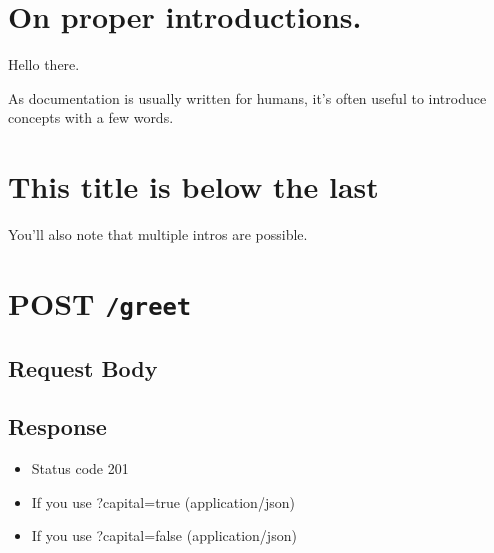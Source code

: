 \section{On proper introductions.}

Hello there.

As documentation is usually written for humans, it's often useful to introduce concepts with a few words.

\section{This title is below the last}

You'll also note that multiple intros are possible.

\section{\texorpdfstring{POST \texttt{/greet}}{POST /greet}}

\subsection{Request Body}

\begin{Shaded}
\begin{Highlighting}[]
\end{Highlighting}
\end{Shaded}

\subsection{Response}

\begin{itemize}
\itemsep1pt\parskip0pt
\item
  Status code 201
\item
  If you use ?capital=true (application/json)

\begin{Shaded}
\begin{Highlighting}[]
\end{Highlighting}
\end{Shaded}
\item
  If you use ?capital=false (application/json)

\begin{Shaded}
\begin{Highlighting}[]
\end{Highlighting}
\end{Shaded}
\end{itemize}

